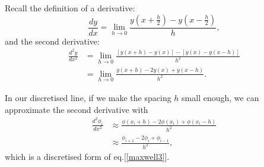 \documentclass[paper=a4,fontsize=11pt]{scrartcl} %
\begin{document}
Recall the definition of a derivative:
\begin{equation}
\frac{dy}{dx} = \lim\limits_{h \to 0}\frac{y(x+\frac{h}{2})-y(x-\frac{h}{2})}{h},
\end{equation}
and the second derivative:
\begin{align}
    \frac{d^2y}{dx^2} &= \lim\limits_{h \to 0}\frac{[y(x+h) - y(x)] - [y(x)-y(x-h)]}{h^2} \\
    &=  \lim\limits_{h \to 0}\frac{y(x+h) - 2y(x) + y(x-h)}{h^2}.
\end{align}

In our discretised line, if we make the spacing $h$ small enough, we can approximate the second derivative with
\begin{align}\label{difference_matrix}
    \frac{d^2\phi_i}{dx^2} &\approx  \frac{\phi(x_i+h) - 2\phi(x_i) + \phi(x_i-h)}{h^2} \\
    &\approx \frac{\phi_{i+1} - 2\phi_i + \phi_{i-1}}{h^2},
\end{align}
which is a discretised form of eq.[\ref{maxwell3}].
\end{document}
